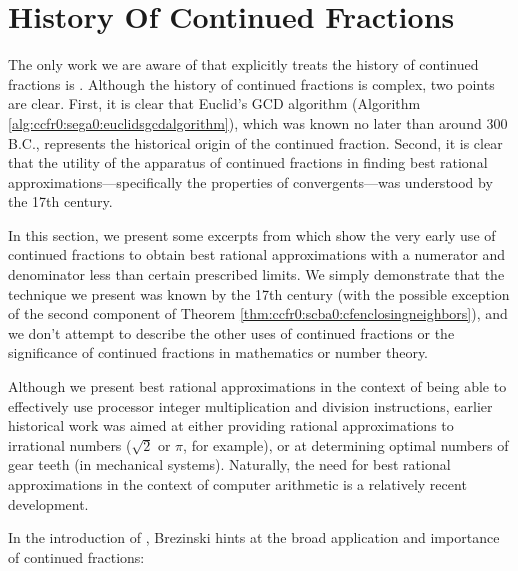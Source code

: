 \section{History Of Continued Fractions}
\label{cfr0:hst0}

The only work we are aware of that explicitly treats the history
of continued fractions is \cite{bibref:b:HistoryCfPadeApproxBrezinski}.
Although the history of continued fractions is complex,
two points are clear.  First, it is clear that Euclid's 
GCD algorithm 
(Algorithm \ref{alg:ccfr0:sega0:euclidsgcdalgorithm}),
which was known no later than around 300 B.C., 
represents the historical origin of the continued fraction.  Second,
it is clear that the utility of the apparatus of continued fractions
in finding best rational approximations---specifically the properties
of convergents---was understood by the 17th century. 

In this section, we present some excerpts from 
\cite{bibref:b:HistoryCfPadeApproxBrezinski}
which show the very early use of continued fractions to obtain best rational
approximations with a numerator and denominator less than certain
prescribed limits.
We simply demonstrate that the technique we present was known by
the 17th century (with the possible exception of the 
second component of Theorem \ref{thm:ccfr0:scba0:cfenclosingneighbors}),
and we don't attempt to describe the other uses
of continued fractions or the significance of continued fractions
in mathematics or number theory.

Although we present best rational
approximations in the context of being able to effectively use
processor integer multiplication and division instructions,
earlier historical work was aimed at either
providing rational approximations to irrational numbers ($\sqrt{2}$ or $\pi$,
for example), or at determining optimal numbers of gear teeth 
(in mechanical systems).  Naturally, the need for best rational approximations
in the context of computer arithmetic is a relatively recent
development.

In the introduction of \cite{bibref:b:HistoryCfPadeApproxBrezinski},
Brezinski  hints at the broad application and importance
of continued fractions:

